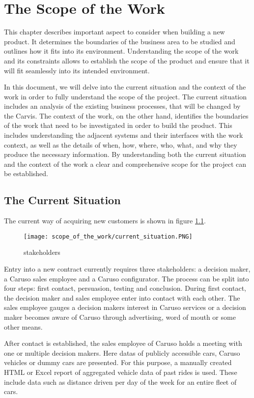 \chapter{The Scope of the Work}

This chapter describes important aspect to consider when building a new product. It determines the boundaries of the business area to be studied and outlines how it fits into its environment. Understanding the scope of the work and its constraints allows to establish the scope of the product and ensure that it will fit seamlessly into its intended environment.

In this document, we will delve into the current situation and the context of the work in order to fully understand the scope of the project. The current situation includes an analysis of the existing business processes, that will be changed by the Carvis. The context of the work, on the other hand, identifies the boundaries of the work that need to be investigated in order to build the product. This includes understanding the adjacent systems and their interfaces with the work context, as well as the details of when, how, where, who, what, and why they produce the necessary information. By understanding both the current situation and the context of the work a clear and comprehensive scope for the project can be established.

\section{The Current Situation}
The current way of acquiring new customers is shown in figure \ref{ScopeOfWork:Situation}.
\begin{figure}[ht]
  \centering
  \texttt{[image: scope\_of\_the\_work/current\_situation.PNG]}
  \caption{\Glspl{stakeholder}}
  \label{ScopeOfWork:Situation}
\end{figure}

Entry into a new contract currently requires three \glspl{stakeholder}: a decision maker, a Caruso sales employee and a Caruso configurator. The process can be split into four steps: first contact, persuasion, testing and conclusion. During first contact, the decision maker and sales employee enter into contact with each other. The sales employee gauges a decision makers interest in Caruso services or a decision maker becomes aware of Caruso through advertising, word of mouth or some other means.

After contact is established, the sales employee of Caruso holds a meeting with one or multiple decision makers. Here \glspl{data} of publicly accessible cars, Caruso vehicles or dummy cars are presented. For this purpose, a manually created HTML or Excel report of aggregated vehicle data of past rides is used. These include data such as distance driven per day of the week for an entire fleet of cars.

